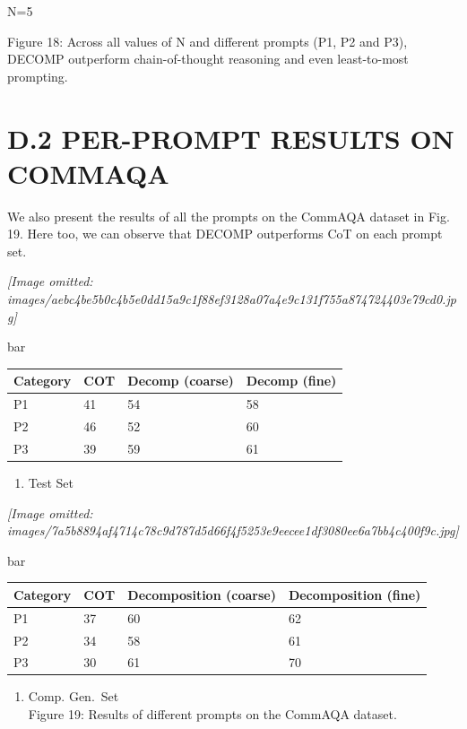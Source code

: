 \documentclass[
]{article}
\newcounter{none} %
\providecommand{\tightlist}{%
  \setlength{\itemsep}{0pt}\setlength{\parskip}{0pt}}
\begin{document}
N=5

Figure 18: Across all values of N and different prompts (P1, P2 and P3),
DECOMP outperform chain-of-thought reasoning and even least-to-most
prompting.

\section{D.2 PER-PROMPT RESULTS ON
COMMAQA}\label{d.2-per-prompt-results-on-commaqa}

We also present the results of all the prompts on the CommAQA dataset in
Fig. 19. Here too, we can observe that DECOMP outperforms CoT on each
prompt set.

\textit{[Image omitted: images/aebc4be5b0c4b5e0dd15a9c1f88ef3128a07a4e9c131f755a874724403e79cd0.jpg]}

bar

{\def\LTcaptype{none} %
\begin{longtable}[]{@{}llll@{}}
\toprule\noalign{}
Category & COT & Decomp (coarse) & Decomp (fine) \\
\midrule\noalign{}
\endhead
\bottomrule\noalign{}
\endlastfoot
P1 & 41 & 54 & 58 \\
P2 & 46 & 52 & 60 \\
P3 & 39 & 59 & 61 \\
\end{longtable}
}

\begin{enumerate}
\def\labelenumi{(\alph{enumi})}
\tightlist
\item
  Test Set
\end{enumerate}

\textit{[Image omitted: images/7a5b8894af4714c78c9d787d5d66f4f5253e9eecee1df3080ee6a7bb4c400f9c.jpg]}

bar

{\def\LTcaptype{none} %
\begin{longtable}[]{@{}llll@{}}
\toprule\noalign{}
Category & COT & Decomposition (coarse) & Decomposition (fine) \\
\midrule\noalign{}
\endhead
\bottomrule\noalign{}
\endlastfoot
P1 & 37 & 60 & 62 \\
P2 & 34 & 58 & 61 \\
P3 & 30 & 61 & 70 \\
\end{longtable}
}

\begin{enumerate}
\def\labelenumi{(\alph{enumi})}
\setcounter{enumi}{1}
\tightlist
\item
  Comp. Gen.~Set\\
  Figure 19: Results of different prompts on the CommAQA dataset.
\end{enumerate}
\end{document}
